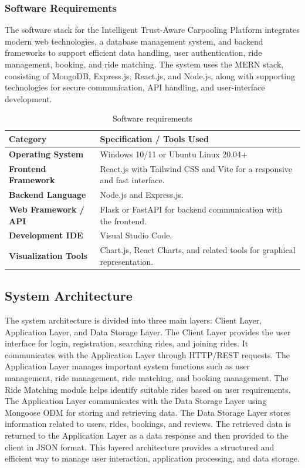 \documentclass[12pt,a4paper,oneside]{report}
\begin{document}
\subsubsection*{Software Requirements}
The software stack for the Intelligent Trust-Aware Carpooling Platform
integrates modern web technologies, a database management system, and backend
frameworks to support efficient data handling, user authentication, ride
management, booking, and ride matching. The system uses the MERN stack,
consisting of MongoDB, Express.js, React.js, and Node.js, along with supporting
technologies for secure communication, API handling, and user-interface
development.

\begin{table}[H]
\centering
\caption{Software requirements}
\begin{tabularx}{0.92\textwidth}{|>{\bfseries}p{}|X|}
\hline
Category & \textbf{Specification / Tools Used}\\
\hline
Operating System & Windows 10/11 or Ubuntu Linux 20.04+\\
\hline
Frontend Framework & React.js with Tailwind CSS and Vite for a responsive and fast interface.\\
\hline
Backend Language & Node.js and Express.js.\\
\hline
Web Framework / API & Flask or FastAPI for backend communication with the frontend.\\
\hline
Development IDE & Visual Studio Code.\\
\hline
Visualization Tools & Chart.js, React Charts, and related tools for graphical representation.\\
\hline
\end{tabularx}
\end{table}

\subsection{System Architecture}
The system architecture is divided into three main layers: Client Layer,
Application Layer, and Data Storage Layer. The Client Layer provides the user
interface for login, registration, searching rides, and joining rides. It
communicates with the Application Layer through HTTP/REST requests. The
Application Layer manages important system functions such as user management,
ride management, ride matching, and booking management. The Ride Matching
module helps identify suitable rides based on user requirements. The
Application Layer communicates with the Data Storage Layer using Mongoose ODM
for storing and retrieving data. The Data Storage Layer stores information
related to users, rides, bookings, and reviews. The retrieved data is returned
to the Application Layer as a data response and then provided to the client in
JSON format. This layered architecture provides a structured and efficient way
to manage user interaction, application processing, and data storage.
\end{document}
